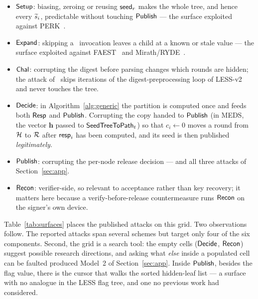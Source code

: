 \begin{itemize}[leftmargin=*,itemsep=1pt]
  \item $\mathsf{Setup}$: biasing, zeroing or reusing $\mathsf{seed}_r$ makes the whole tree,
        and hence every $\widetilde{s}_i$, predictable without touching $\mathsf{Publish}$
        --- the surface exploited against
        PERK~\cite{cryptoeprint:2026/1266}.
  \item $\mathsf{Expand}$: skipping a \PRG\ invocation leaves a child at a known or
        stale value --- the surface exploited against
        FAEST~\cite{JendralD25} and Mirath/RYDE~\cite{BandaBK26}.
  \item $\mathsf{Chal}$: corrupting the digest before parsing changes which rounds are
        hidden; the attack of~\cite{HuangHHYSTY26} skips iterations of the
        digest-preprocessing loop of LESS-v2 and never touches the tree.
  \item $\mathsf{Decide}$: in Algorithm~\ref{alg:generic} the partition is computed
        once and feeds both $\mathsf{Resp}$ and $\mathsf{Publish}$. Corrupting the copy handed
        to $\mathsf{Publish}$ (in MEDS, the vector $\mathbf{h}$ passed to
        $\mathsf{SeedTreeToPath}_t$) so that $c_i \leftarrow 0$ moves a round from
        $\mathcal{H}$ to $\mathcal{R}$ after $\mathsf{resp}_i$ has been computed, and its seed is
        then published \emph{legitimately}.
  \item $\mathsf{Publish}$: corrupting the per-node release decision ---
        \cite{ZKFault,FaultToForge2025} and all three attacks of
        Section~\ref{sec:app}.
  \item $\mathsf{Recon}$: verifier-side, so relevant to acceptance rather than key
        recovery; it matters here because a verify-before-release
        countermeasure runs $\mathsf{Recon}$ on the signer's own device.
\end{itemize}

Table~\ref{tab:surfaces} places the published attacks on this grid. Two
observations follow. The reported attacks span several schemes but target only four of the six
components. Second, the grid is a search tool: the empty
cells ($\mathsf{Decide}$, $\mathsf{Recon}$) suggest possible research directions, and asking what \emph{else}
inside a populated cell can be faulted produced Model~2 of
Section~\ref{sec:app}. Inside $\mathsf{Publish}$, besides the flag value, there is
the cursor that walks the sorted hidden-leaf list --- a surface with no
analogue in the LESS flag tree, and one no previous work had considered.

